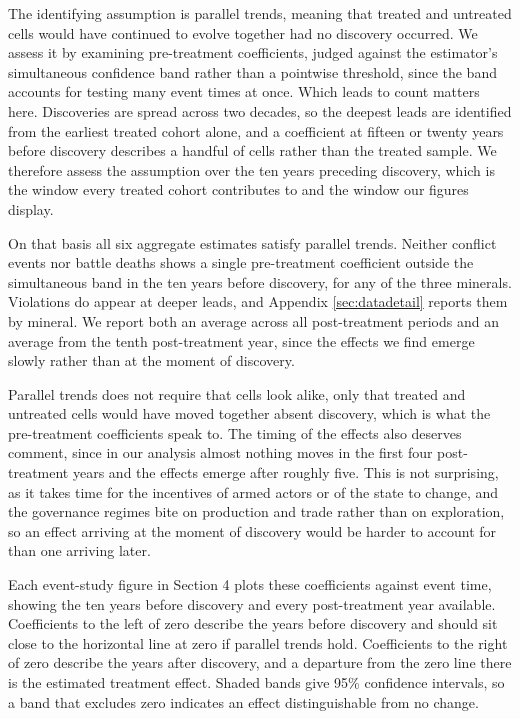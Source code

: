 \documentclass[11pt]{article}
\begin{document}
The identifying assumption is parallel trends, meaning that treated and untreated cells would have continued to evolve together had no discovery occurred. We assess it by examining pre-treatment coefficients, judged against the estimator's simultaneous confidence band rather than a pointwise threshold, since the band accounts for testing many event times at once. Which leads to count matters here. Discoveries are spread across two decades, so the deepest leads are identified from the earliest treated cohort alone, and a coefficient at fifteen or twenty years before discovery describes a handful of cells rather than the treated sample. We therefore assess the assumption over the ten years preceding discovery, which is the window every treated cohort contributes to and the window our figures display.

On that basis all six aggregate estimates satisfy parallel trends. Neither conflict events nor battle deaths shows a single pre-treatment coefficient outside the simultaneous band in the ten years before discovery, for any of the three minerals. Violations do appear at deeper leads, and Appendix \ref{sec:datadetail} reports them by mineral. We report both an average across all post-treatment periods and an average from the tenth post-treatment year, since the effects we find emerge slowly rather than at the moment of discovery.

Parallel trends does not require that cells look alike, only that treated and untreated cells would have moved together absent discovery, which is what the pre-treatment coefficients speak to. The timing of the effects also deserves comment, since in our analysis almost nothing moves in the first four post-treatment years and the effects emerge after roughly five. This is not surprising, as it takes time for the incentives of armed actors or of the state to change, and the governance regimes bite on production and trade rather than on exploration, so an effect arriving at the moment of discovery would be harder to account for than one arriving later.

Each event-study figure in Section 4 plots these coefficients against event time, showing the ten years before discovery and every post-treatment year available. Coefficients to the left of zero describe the years before discovery and should sit close to the horizontal line at zero if parallel trends hold. Coefficients to the right of zero describe the years after discovery, and a departure from the zero line there is the estimated treatment effect. Shaded bands give 95\% confidence intervals, so a band that excludes zero indicates an effect distinguishable from no change.
\end{document}
